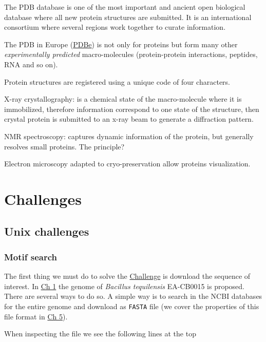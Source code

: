 \documentclass[
  letterpaper,
  DIV=11,
  numbers=noendperiod,
  oneside]{scrreprt}
\begin{document}
The PDB database is one of the most important and ancient open
biological database where all new protein structures are submitted. It
is an international consortium where several regions work together to
curate information.

The PDB in Europe (\href{pdbe.org}{PDBe}) is not only for proteins but
form many other \emph{experimentally predicted} macro-molecules
(protein-protein interactions, peptides, RNA and so on).

Protein structures are registered using a unique code of four
characters.

X-ray crystallography: is a chemical state of the macro-molecule where
it is immobilized, therefore information correspond to one state of the
structure, then crystal protein is submitted to an x-ray beam to
generate a diffraction pattern.

NMR spectroscopy: captures dynamic information of the protein, but
generally resolves small proteins. The principle?

Electron microscopy adapted to cryo-preservation allow proteins
visualization.

\part{Challenges}

\hypertarget{unix-challenges}{%
\chapter*{Unix challenges}\label{unix-challenges}}

\hypertarget{motif-search}{%
\section*{Motif search}\label{motif-search}}

The first thing we must do to solve the
\protect\hyperlink{anatomy-of-a-command}{Challenge} is download the
sequence of interest. In \protect\hyperlink{anatomy-of-a-command}{Ch 1}
the genome of \emph{Bacillus tequilensis} EA-CB0015 is proposed. There
are several ways to do so. A simple way is to search in the NCBI
databases for the entire genome and download as \texttt{FASTA} file (we
cover the properties of this file format in
\protect\hyperlink{sec-seq-analysis}{Ch 5}).

When inspecting the file we see the following lines at the top
\end{document}
